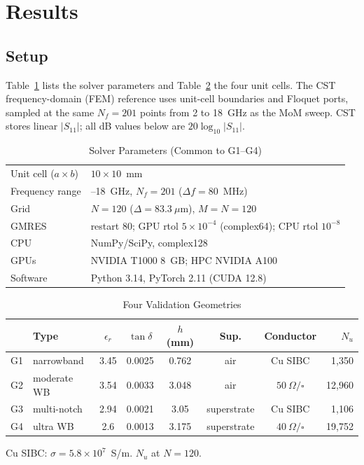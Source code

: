 \documentclass[10pt,conference]{IEEEtran}
\begin{document}
	\section{Results}
	\label{sec:results}
	
	\subsection{Setup}
	
	Table~\ref{tab:setup} lists the solver parameters and
	Table~\ref{tab:geoms} the four unit cells. The CST frequency-domain (FEM)
	reference uses unit-cell boundaries and Floquet ports, sampled at the same
	$N_f=201$ points from 2 to 18~GHz as the MoM sweep. CST stores linear
	$|S_{11}|$; all dB values below are $20\log_{10}|S_{11}|$.
	
	\begin{table}[t]
		\centering
		\caption{Solver Parameters (Common to G1--G4)}
		\label{tab:setup}
		\small
		\setlength{\tabcolsep}{4pt}
		\begin{tabular}{@{}>{\raggedright\arraybackslash}p{}
			>{\raggedright\arraybackslash}p{}@{}}
			\hline
			Unit cell ($a\times b$) & $10\times10$~mm\\
			Frequency range & 2--18~GHz, $N_f=201$ ($\Delta f=80$~MHz)\\
			Grid & $N=120$ ($\Delta=83.3~\mu$m), $M=N=120$\\
			GMRES & restart 80; GPU rtol $5\times10^{-4}$ (complex64);
			CPU rtol $10^{-8}$\\
			CPU & NumPy/SciPy, complex128\\
			GPUs & NVIDIA T1000 8~GB; HPC NVIDIA A100\\
			Software & Python 3.14, PyTorch 2.11 (CUDA 12.8)\\
			\hline
		\end{tabular}
	\end{table}
	
	\begin{table}[t]
		\centering
		\caption{Four Validation Geometries}
		\label{tab:geoms}
		\begin{tabular}{c l c c c c c r}
			\hline
			& Type & $\epsilon_r$ & $\tan\delta$ & $h$ (mm) & Sup. & Conductor & $N_u$\\
			\hline
			G1 & narrowband & 3.45 & 0.0025 & 0.762 & air & Cu SIBC & 1{,}350\\
			G2 & moderate WB & 3.54 & 0.0033 & 3.048 & air & $50~\Omega/\square$ & 12{,}960\\
			G3 & multi-notch & 2.94 & 0.0021 & 3.05 & superstrate & Cu SIBC & 1{,}106\\
			G4 & ultra WB & 2.6 & 0.0013 & 3.175 & superstrate & $40~\Omega/\square$ & 19{,}752\\
			\hline
		\end{tabular}

		\vspace{2pt}
		{\footnotesize Cu SIBC: $\sigma=5.8\times10^{7}$~S/m.
			$N_u$ at $N=120$.\par}
	\end{table}
	
\end{document}
